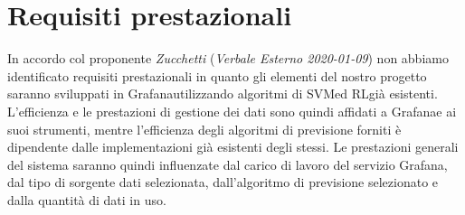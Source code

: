 \section*{Requisiti prestazionali}
	In accordo col proponente \textit{Zucchetti} (\textit{Verbale Esterno 2020-01-09}) non abbiamo identificato requisiti prestazionali in quanto gli elementi del nostro progetto saranno sviluppati in Grafana\glosp utilizzando algoritmi di SVM\glosp ed RL\glosp già esistenti. L'efficienza e le prestazioni di gestione dei dati sono quindi affidati a Grafana\glosp e ai suoi strumenti, mentre l'efficienza degli algoritmi di previsione forniti è dipendente dalle implementazioni già esistenti degli stessi. Le prestazioni generali del sistema saranno quindi influenzate dal carico di lavoro del servizio Grafana\glosp, dal tipo di sorgente dati selezionata, dall'algoritmo di previsione selezionato e dalla quantità di dati in uso.

